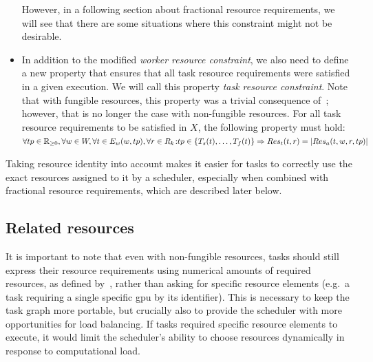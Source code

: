 \begin{itemize}[itemsep=0pt]
	However, in a following section about fractional resource requirements, we will see that there
	are some situations where this constraint might not be desirable.
	\item[\makedef{def:task_resource_constraint}] In addition to the modified
	\emph{worker resource constraint}, we also need to define a new property that ensures that
	all task resource requirements were satisfied in a given execution. We will call this
	property \emph{task resource constraint}. Note that with fungible resources, this property was a
	trivial consequence of~; however, that is no longer
	the case with non-fungible resources. For all task resource requirements to be satisfied in
	$X$, the following property must hold: \\
	$\forall tp\in\mathbb{R}_{\geq{}0}, \forall w\in{}W, \forall t\in{}E_w(w, tp), \forall r\in{}R_k\colon \\
	tp \in \{T_s(t),\ldots,T_f(t)\} \Rightarrow Res_t(t, r) = |Res_a(t, w, r, tp)|$ \\
\end{itemize}

Taking resource identity into account makes it easier for tasks to correctly use the exact
resources assigned to it by a scheduler, especially when
combined with fractional resource requirements, which are described later below.

\subsection{Related resources}
It is important to note that even with non-fungible resources, tasks should still express their
resource requirements using numerical amounts of required resources,
as defined by~, rather than asking for specific resource elements (e.g.\
a task requiring a single specific \gls{gpu} by its identifier). This is necessary to keep the
task graph more portable, but crucially also to provide the scheduler with more opportunities for
load balancing. If tasks required specific resource elements to execute, it would limit the
scheduler's ability to choose resources dynamically in response to computational load.

